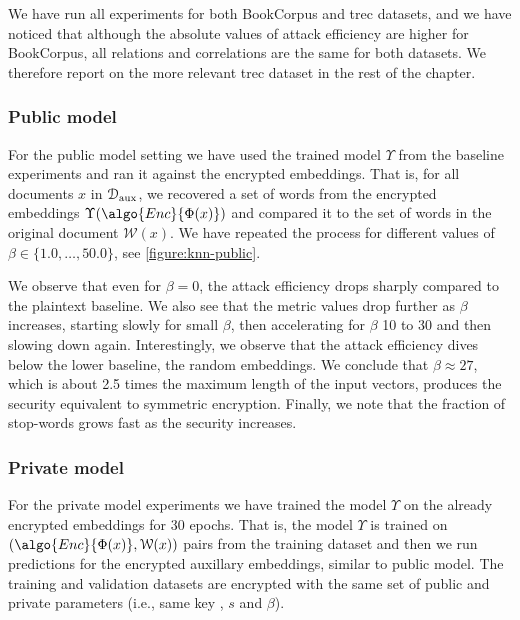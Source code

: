 				We have run all experiments for both BookCorpus and \acrshort{trec} datasets, and we have noticed that although the absolute values of attack efficiency are higher for BookCorpus, all relations and correlations are the same for both datasets.
				We therefore report on the more relevant \acrshort{trec} dataset in the rest of the chapter.

			\subsubsection{Public model}

				For the public model setting we have used the trained model $\Upsilon$ from the baseline experiments and ran it against the encrypted embeddings.
				That is, for all documents $x$ in $\mathcal{D}_\text{aux}$, we recovered a set of words from the encrypted embeddings $\Upsilon( \algo{Enc}{ \Phi(x) } )$ and compared it to the set of words in the original document $\mathcal{W}(x)$.
				We have repeated the process for different values of $\beta \in \{ 1.0, \ldots, 50.0 \}$, see \cref{figure:knn-public}.

				

				We observe that even for $\beta = 0$, the attack efficiency drops sharply compared to the plaintext baseline.
				We also see that the metric values drop further as $\beta$ increases, starting slowly for small $\beta$, then accelerating for $\beta$ 10 to 30 and then slowing down again.
				Interestingly, we observe that the attack efficiency dives below the lower baseline, the random embeddings.
				We conclude that $\beta \approx 27$, which is about 2.5 times the maximum length of the input vectors, produces the security equivalent to symmetric encryption.
				Finally, we note that the fraction of stop-words grows fast as the security increases.

			\subsubsection{Private model}

				For the private model experiments we have trained the model $\Upsilon$ on the already encrypted embeddings for 30 epochs.
				That is, the model $\Upsilon$ is trained on $ ( \algo{Enc}{ \Phi(x) }, \mathcal{W}(x) ) $ pairs from the training dataset and then we run predictions for the encrypted auxillary embeddings, similar to public model.
				The training and validation datasets are encrypted with the same set of public and private parameters (i.e., same key \key{}, $s$ and $\beta$).

